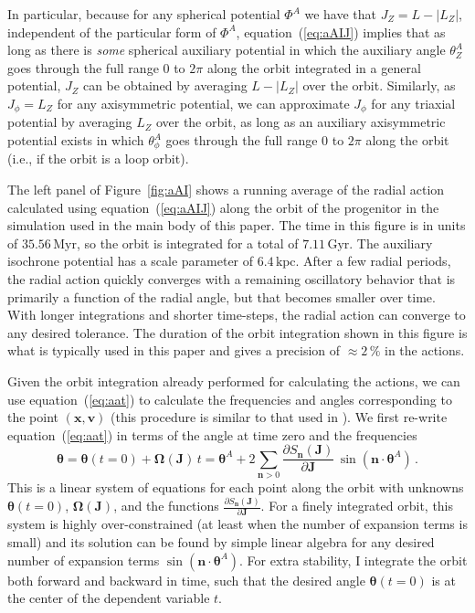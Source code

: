 \documentclass{emulateapj}
\newcommand{\ie}{i.e.}
\newcommand{\eqnname}{equation}
\newcommand{\equationname}{\eqnname}
\renewcommand{\figurename}{Figure}
\renewcommand{\vec}[1]{\ensuremath{\mathbf{#1}}}
\newcommand{\vecx}{\ensuremath{\vec{x}}}
\newcommand{\vecv}{\ensuremath{\vec{v}}}
\newcommand{\vecj}{\ensuremath{\vec{J}}}
\newcommand{\vecn}{\ensuremath{\vec{n}}}
\newcommand{\veco}{\ensuremath{\vec{\Omega}}}
\newcommand{\veca}{\ensuremath{\boldsymbol\theta}}
\newcommand{\Myr}{\ensuremath{\,\mathrm{Myr}}}
\newcommand{\Gyr}{\ensuremath{\,\mathrm{Gyr}}}
\newcommand{\kpc}{\ensuremath{\,\mathrm{kpc}}}
\begin{document}
In particular, because for any spherical potential $\Phi^A$ we have
that $J_Z = L-|L_Z|$, independent of the particular form of $\Phi^A$,
\equationname~(\ref{eq:aAIJ}) implies that as long as there is
\emph{some} spherical auxiliary potential in which the auxiliary angle
$\theta^A_Z$ goes through the full range $0$ to $2\pi$ along the orbit
integrated in a general potential, $J_Z$ can be obtained by averaging
$L-|L_Z|$ over the orbit. Similarly, as $J_\phi = L_Z$ for any
axisymmetric potential, we can approximate $J_\phi$ for any triaxial
potential by averaging $L_Z$ over the orbit, as long as an auxiliary
axisymmetric potential exists in which $\theta^A_\phi$ goes through
the full range $0$ to $2\pi$ along the orbit (\ie, if the orbit is a
loop orbit).

The left panel of \figurename~\ref{fig:aAI} shows a running average of
the radial action calculated using \eqnname~(\ref{eq:aAIJ}) along the
orbit of the progenitor in the simulation used in the main body of
this paper. The time in this figure is in units of $35.56\Myr$, so the
orbit is integrated for a total of $7.11\Gyr$. The auxiliary isochrone
potential has a scale parameter of $6.4\kpc$. After a few radial
periods, the radial action quickly converges with a remaining
oscillatory behavior that is primarily a function of the radial angle,
but that becomes smaller over time. With longer integrations and
shorter time-steps, the radial action can converge to any desired
tolerance. The duration of the orbit integration shown in this figure
is what is typically used in this paper and gives a precision of
$\approx2\,\%$ in the actions.

Given the orbit integration already performed for calculating the
actions, we can use \equationname~(\ref{eq:aat}) to calculate the
frequencies and angles corresponding to the point $(\vecx,\vecv)$
(this procedure is similar to that used in \citealt{McMillan08a}). We
first re-write \equationname~(\ref{eq:aat}) in terms of the angle at
time zero and the frequencies
\begin{equation}\label{eq:aat2}
  \veca = \veca(t=0) + \veco(\vecj) \,t = \veca^A +2\sum_{\vecn > 0} \frac{\partial S_{\vecn}(\vecj)}{\partial \vecj}\,\sin(\vecn\cdot\veca^A)\,.
\end{equation}
This is a linear system of equations for each point along the orbit
with unknowns $\veca(t=0)$, $\veco(\vecj)$, and the functions
$\frac{\partial S_{\vecn}(\vecj)}{\partial \vecj}$. For a finely
integrated orbit, this system is highly over-constrained (at least
when the number of expansion terms is small) and its solution can be
found by simple linear algebra for any desired number of expansion
terms $\sin(\vecn\cdot\veca^A)$. For extra stability, I integrate the
orbit both forward and backward in time, such that the desired angle
$\veca(t=0)$ is at the center of the dependent variable $t$.
\end{document}
